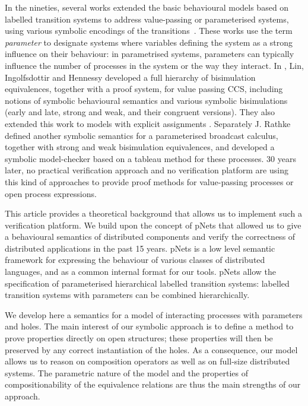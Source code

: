 \documentclass{lmcs}
\begin{document}
In the nineties, several 
works extended the basic behavioural models based on labelled
transition systems to address value-passing or parameterised systems, using
various symbolic encodings of the
transitions~\cite{deSimone85,Larsen87}. 
These works use the term \emph{parameter} to designate systems where variables defining the system as a strong influence on their behaviour: in parametrised systems, parameters can typically influence the number of processes in the system or the way they interact.
In \cite{IngolfsdottirL:2001,HennessyLin:TCS95}, Lin, Ingolfsdottir and Hennessy developed a full hierarchy of
bisimulation equivalences, together with a proof system, for value passing CCS,
including notions of symbolic behavioural semantics and various symbolic 
bisimulations (early and late, strong and weak, and their congruent versions). They also extended this work to models with explicit assignments \cite{Linconcur96}.
Separately J. Rathke~\cite{HennessyRathke:TCS98} defined another symbolic semantics for 
a parameterised broadcast calculus, together with strong and weak bisimulation
equivalences, and developed a symbolic model-checker based on a tableau
method for these processes. 30 years later, no
practical verification approach and no verification platform are
using this kind of approaches to provide proof methods for
value-passing processes or open process expressions. 


This article provides a theoretical background that allows us to implement such a verification 
platform. We build upon the concept of pNets that allowed us to give a behavioural semantics 
of distributed components and verify the correctness of distributed applications in the past 15 years. pNets  is a
low level semantic framework for expressing the behaviour of various
classes of distributed languages, and as a common internal format for
our tools.  pNets allow the
specification of parameterised hierarchical labelled
transition systems:  labelled transition systems with parameters can be
combined hierarchically.


We develop here a semantics for a model of interacting processes with parameters and holes. 
The main interest of our symbolic approach is to define a method to
prove properties directly on open structures; these properties will then be preserved
by any correct instantiation of the holes.
As a consequence, our model allows us to reason on composition
operators as well as on full-size distributed systems. The parametric
nature of the model and the properties of compositionability of the
equivalence relations are thus  the main
strengths of  our approach. 
\end{document}
